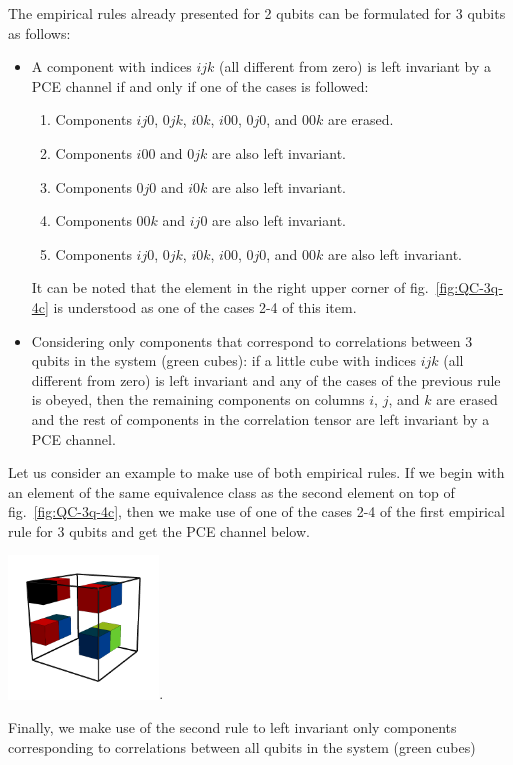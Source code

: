 \documentclass[11pt,dvipsnames]{article} %
\newcommand{\fref}[1]{fig.~\ref{#1}}  \newcommand{\tref}[1]{table~\ref{#1}}
\newcommand{\1}{\mathds{1}}
\begin{document}
The empirical rules already presented for 2 qubits can be 
formulated for 3 qubits as follows:
\begin{itemize}
	\item A component with indices $ijk$ (all different from zero) is
	left invariant by a PCE channel if and only if 
	one of the cases is followed:
	\begin{enumerate}
		\item Components $ij0$, $0jk$, $i0k$, $i00$, $0j0$, and
		$00k$ are erased.
		\item Components $i00$ and $0jk$ are also left invariant.
		\item Components $0j0$ and $i0k$ are also left invariant.
		\item Components $00k$ and $ij0$ are also left invariant.
		\item Components $ij0$, $0jk$, $i0k$, $i00$, $0j0$, and
		$00k$ are also left invariant.
	\end{enumerate}
	It can be noted that the element in the right upper corner of 
	\fref{fig:QC-3q-4c} is understood as one of the cases 2-4 of this item.
	\item Considering only components that correspond to correlations between
	3 qubits in the system (green cubes): if a little cube 
	with indices $ijk$ (all different from zero) is left invariant 
	and any of the cases of the previous rule is obeyed, 
	then the remaining components on columns $i$, $j$, and $k$ are
	erased and the rest of components in the correlation tensor 
	are left invariant by a PCE channel. 
\end{itemize}
Let us consider an example to make use of both empirical rules. If we 
begin with an element of the same equivalence class as the second
element on top of \fref{fig:QC-3q-4c}, then we make use of one of 
the cases 2-4 of the first empirical rule for 3 qubits and get the PCE channel below.
\begin{center}
	\includegraphics[width=4cm]{img/3q-8c-je}.
\end{center}
Finally, we make use of the second rule to left invariant only components
corresponding to correlations between all qubits in the system (green cubes)
\end{document}
